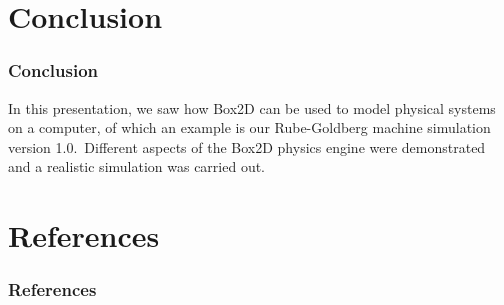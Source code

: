 \section{Conclusion}

\begin{frame}
\frametitle{Conclusion}
In this presentation, we saw how Box2D can be used to model physical systems on a computer, of which an example is our Rube-Goldberg machine simulation version 1.0.\ 
Different aspects of the Box2D physics engine were demonstrated and a realistic simulation was carried out.
\end{frame}



\section{References}



\begin{frame}
\frametitle{References}
{}

\end{frame}



